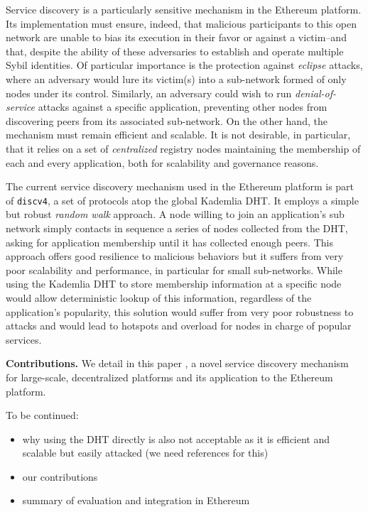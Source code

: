 Service discovery is a particularly sensitive mechanism in the Ethereum platform.
Its implementation must ensure, indeed, that malicious participants to this open network are unable to bias its execution in their favor or against a victim--and that, despite the ability of these adversaries to establish and operate multiple Sybil identities.
Of particular importance is the protection against \emph{eclipse} attacks, where an adversary would lure its victim(s) into a sub-network formed of only nodes under its control. %
Similarly, an adversary could wish to run \emph{denial-of-service} attacks against a specific application, preventing other nodes from discovering peers from its associated sub-network.
On the other hand, the mechanism must remain efficient and scalable.
It is not desirable, in particular, that it relies on a set of \emph{centralized} registry nodes maintaining the membership of each and every application, both for scalability and governance reasons.

The current service discovery mechanism used in the Ethereum platform is part of \texttt{discv4}, a set of protocols atop the global Kademlia DHT.
It employs a simple but robust \emph{random walk} approach.
A node willing to join an application's sub network simply contacts in sequence a series of nodes collected from the DHT, asking for application membership until it has collected enough peers. %
This approach offers good resilience to malicious behaviors
but it suffers from very poor scalability and performance, in particular for small sub-networks.
While using the Kademlia DHT to store membership information at a specific node would allow deterministic lookup of this information, regardless of the application's popularity, this solution would suffer from very poor robustness to attacks and would lead to hotspots and overload for nodes in charge of popular services.

\smallskip
\noindent
\textbf{Contributions.}
%
We detail in this paper \sysname, a novel service discovery mechanism for large-scale, decentralized platforms and its application to the Ethereum platform.
\sysname 


To be continued:
\begin{itemize}
  \item why using the DHT directly is also not acceptable as it is efficient and scalable but easily attacked (we need references for this)
  \item our contributions
  \item summary of evaluation and integration in Ethereum
\end{itemize}
